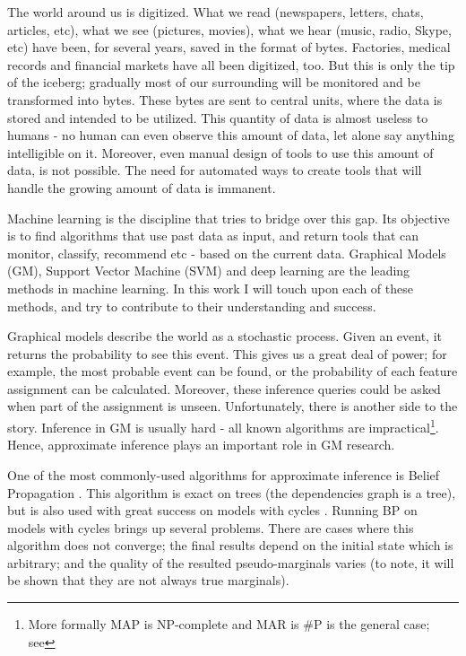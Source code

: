 The world around us is digitized.
What we read (newspapers, letters, chats, articles, etc), what we see (pictures, movies), what we hear (music, radio, Skype, etc) have been, for several years, saved in the format of bytes.
Factories, medical records and financial markets have all been digitized, too.
But this is only the tip of the iceberg; gradually most of our surrounding will be monitored and be transformed into bytes.
These bytes are sent to central units, where the data is stored and intended to be utilized.
This quantity of data is almost useless to humans - no human can even observe this amount of data, let alone say anything intelligible on it.
Moreover, even manual design of tools to use this amount of data, is not possible.
The need for automated ways to create tools that will handle the growing amount of data is immanent.   

Machine learning is the discipline that tries to bridge over this gap.
Its objective is to find algorithms that use past data as input, and return tools that can monitor, classify, recommend etc -  based on the current data.
Graphical Models (GM), Support Vector Machine (SVM) and deep learning are the leading methods in machine learning.
In this work I will touch upon each of these methods, and try to contribute to their understanding and success.

Graphical models describe the world as a stochastic process.
Given an event, it returns the probability to see this event.
This gives us a great deal of power; for example, the most probable event can be found, or the probability of each feature assignment can be calculated.
Moreover, these inference queries could be asked when part of the assignment is unseen.
Unfortunately, there is another side to the story. Inference in GM is usually hard - all known algorithms are impractical\footnote{More formally MAP is NP-complete and MAR is \#P is the general case; see }.
Hence, approximate inference plays an important role in GM research.

One of the most commonly-used algorithms for approximate inference is Belief Propagation \cite{pearl1986fusion}.
This algorithm is exact on trees (the dependencies graph is a tree), but is also used with great success on models with cycles \cite{willsky2002multiresolution,loeliger2004introduction,kschischang2003codes}.
Running BP on models with cycles brings up several problems.
There are cases where this algorithm does not converge; the final results depend on the initial state which is arbitrary; and the quality of the resulted pseudo-marginals varies  (to note, it will be shown that they are not always true marginals).

